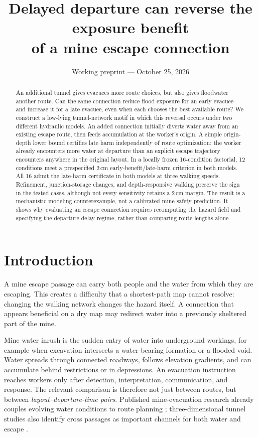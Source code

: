 \documentclass[11pt]{article}
\title{Delayed departure can reverse the exposure benefit\\of a mine escape connection}
\author{}
\date{Working preprint --- October 25, 2026}
\begin{document}
\maketitle
\begin{abstract}
An additional tunnel gives evacuees more route choices, but also gives floodwater another route. Can the same connection reduce flood exposure for an early evacuee and increase it for a late evacuee, even when each chooses the best available route? We construct a low-lying tunnel-network motif in which this reversal occurs under two different hydraulic models. An added connection initially diverts water away from an existing escape route, then feeds accumulation at the worker's origin. A simple origin-depth lower bound certifies late harm independently of route optimization: the worker already encounters more water at departure than an explicit escape trajectory encounters anywhere in the original layout. In a locally frozen 16-condition factorial, 12 conditions meet a prespecified 2\,cm early-benefit/late-harm criterion in both models. All 16 admit the late-harm certificate in both models at three walking speeds. Refinement, junction-storage changes, and depth-responsive walking preserve the sign in the tested cases, although not every sensitivity retains a 2\,cm margin. The result is a mechanistic modeling counterexample, not a calibrated mine safety prediction. It shows why evaluating an escape connection requires recomputing the hazard field and specifying the departure-delay regime, rather than comparing route lengths alone.
\end{abstract}

\section{Introduction}
A mine escape passage can carry both people and the water from which they are escaping. This creates a difficulty that a shortest-path map cannot resolve: changing the walking network changes the hazard itself. A connection that appears beneficial on a dry map may redirect water into a previously sheltered part of the mine.

Mine water inrush is the sudden entry of water into underground workings, for example when excavation intersects a water-bearing formation or a flooded void. Water spreads through connected roadways, follows elevation gradients, and can accumulate behind restrictions or in depressions. An evacuation instruction reaches workers only after detection, interpretation, communication, and response. The relevant comparison is therefore not just between routes, but between \emph{layout--departure-time pairs}. Published mine-evacuation research already couples evolving water conditions to route planning \cite{wu}; three-dimensional tunnel studies also identify cross passages as important channels for both water and escape \cite{pan}.
\end{document}
